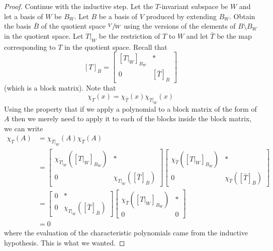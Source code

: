 \documentclass{report}
\begin{document}
\begin{proof}
            Continue with the inductive step. Let the $T$-invariant subspace be $W$ and let a basis of $W$ be
            $B_W$. Let $B$ be a basis of $V$ produced by extending $B_W$. Obtain the basis $\bar{B}$ of the
            quotient space $\sfrac{V}{W}$ using the versions of the elements of $B \setminus B_W$ in the
            quotient space. Let $T\vert_W$ be the restriction of $T$ to $W$ and let $\bar{T}$ be the
            map corresponding to $T$ in the quotient space. Recall that 
            \[ [T]_B = \begin{bmatrix} [T\vert_W]_{B_W} & \ast \\ 0 & [\bar{T}]_{\bar{B}} \end{bmatrix} \]
            (which is a block matrix). Note that 
            \[ \chi_T (x) = \chi_{\bar{T}} (x) \chi_{T\vert_W} (x)\]
            Using the property that if we apply a polynomial to a block matrix of the form of $A$ then we merely
            need to apply it to each of the blocks inside the block matrix, we can write
            \begin{align*}
                \chi_T (A) &= \chi_{T\vert_W} (A) \chi_{\bar{T}} (A) \\
                &= \begin{bmatrix} \chi_{T\vert_{W}} \left([T\vert_W]_{B_W}\right) & \ast \\
                0 & \chi_{T\vert_{W}} \left([\bar{T}]_{\bar{B}}\right) \end{bmatrix}
                \begin{bmatrix} \chi_{\bar{T}} \left([T\vert_W]_{B_W}\right) & \ast \\
                0 & \chi_{\bar{T}} \left([\bar{T}]_{\bar{B}}\right) \end{bmatrix} \\
                &= \begin{bmatrix} 0 & \ast \\ 0 & \chi_{T\vert_{W}} \left( [\bar{T}]_{\bar{B}}\right) \end{bmatrix}
                \begin{bmatrix} \chi_{\bar{T}} \left([T\vert_W]_{B_W}\right) & \ast \\ 0 & 0 \end{bmatrix} \\
                &= 0
            \end{align*}
            where the evaluation of the characteristic polynomials came from the inductive hypothesis. This is what we wanted.


\end{proof}
\end{document}
